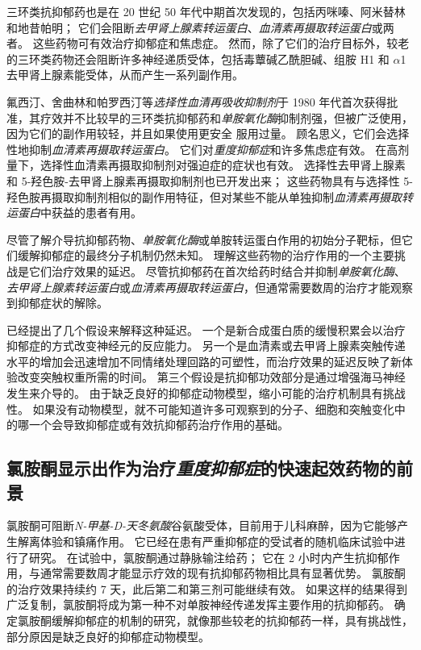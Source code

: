 三环类抗抑郁药也是在 20 世纪 50 年代中期首次发现的，包括丙咪嗪、阿米替林和地昔帕明；
它们会阻断\textit{去甲肾上腺素转运蛋白}、\textit{血清素再摄取转运蛋白}或两者。
这些药物可有效治疗抑郁症和焦虑症。
然而，除了它们的治疗目标外，较老的三环类药物还会阻断许多神经递质受体，包括毒蕈碱乙酰胆碱、组胺 H1 和 $\alpha$1 去甲肾上腺素能受体，从而产生一系列副作用。


氟西汀、舍曲林和帕罗西汀等\textit{选择性血清再吸收抑制剂}于 1980 年代首次获得批准，其疗效并不比较早的三环类抗抑郁药和\textit{单胺氧化酶}抑制剂强，但被广泛使用，因为它们的副作用较轻，并且如果使用更安全 服用过量。
顾名思义，它们会选择性地抑制\textit{血清素再摄取转运蛋白}。
它们对\textit{重度抑郁症}和许多焦虑症有效。
在高剂量下，选择性血清素再摄取抑制剂对强迫症的症状也有效。
选择性去甲肾上腺素和 5-羟色胺-去甲肾上腺素再摄取抑制剂也已开发出来；
这些药物具有与选择性 5-羟色胺再摄取抑制剂相似的副作用特征，但对某些不能从单独抑制\textit{血清素再摄取转运蛋白}中获益的患者有用。


尽管了解介导抗抑郁药物、\textit{单胺氧化酶}或单胺转运蛋白作用的初始分子靶标，但它们缓解抑郁症的最终分子机制仍然未知。
理解这些药物的治疗作用的一个主要挑战是它们治疗效果的延迟。
尽管抗抑郁药在首次给药时结合并抑制\textit{单胺氧化酶}、\textit{去甲肾上腺素转运蛋白}或\textit{血清素再摄取转运蛋白}，但通常需要数周的治疗才能观察到抑郁症状的解除。


已经提出了几个假设来解释这种延迟。
一个是新合成蛋白质的缓慢积累会以治疗抑郁症的方式改变神经元的反应能力。
另一个是血清素或去甲肾上腺素突触传递水平的增加会迅速增加不同情绪处理回路的可塑性，而治疗效果的延迟反映了新体验改变突触权重所需的时间。
第三个假设是抗抑郁功效部分是通过增强海马神经发生来介导的。
由于缺乏良好的抑郁症动物模型，缩小可能的治疗机制具有挑战性。
如果没有动物模型，就不可能知道许多可观察到的分子、细胞和突触变化中的哪一个会导致抑郁症或有效抗抑郁药治疗作用的基础。



\subsection{氯胺酮显示出作为治疗\textit{重度抑郁症}的快速起效药物的前景}

氯胺酮可阻断\textit{N-甲基-D-天冬氨酸}谷氨酸受体，目前用于儿科麻醉，因为它能够产生解离体验和镇痛作用。
它已经在患有严重抑郁症的受试者的随机临床试验中进行了研究。
在试验中，氯胺酮通过静脉输注给药；
它在 2 小时内产生抗抑郁作用，与通常需要数周才能显示疗效的现有抗抑郁药物相比具有显著优势。
氯胺酮的治疗效果持续约 7 天，此后第二和第三剂可能继续有效。
如果这样的结果得到广泛复制，氯胺酮将成为第一种不对单胺神经传递发挥主要作用的抗抑郁药。
确定氯胺酮缓解抑郁症的机制的研究，就像那些较老的抗抑郁药一样，具有挑战性，部分原因是缺乏良好的抑郁症动物模型。



